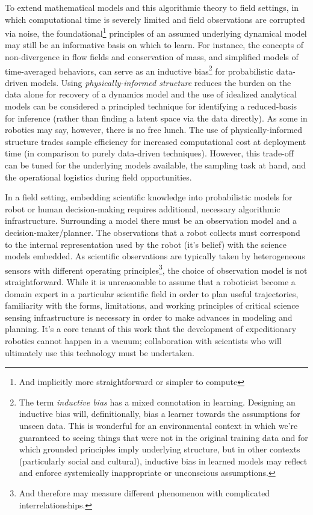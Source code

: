 To extend mathematical models and this algorithmic theory to field settings, in which computational time is severely limited and field observations are corrupted via noise, the foundational\footnote{And implicitly more straightforward or simpler to compute} principles of an assumed underlying dynamical model may still be an informative basis on which to learn.
For instance, the concepts of non-divergence in flow fields and conservation of mass, and simplified models of time-averaged behaviors, can serve as an inductive bias\footnote{The term \emph{inductive bias} has a mixed connotation in learning. Designing an inductive bias will, definitionally, bias a learner towards the assumptions for unseen data. This is wonderful for an environmental context in which we're guaranteed to seeing things that were not in the original training data and for which grounded principles imply underlying structure, but in other contexts (particularly social and cultural), inductive bias in learned models may reflect and enforce systemically inappropriate or unconscious assumptions.} for probabilistic data-driven models.
Using \emph{physically-informed structure} reduces the burden on the data alone for recovery of a dynamics model and the use of idealized analytical models can be considered a principled technique for identifying a reduced-basis for inference (rather than finding a latent space via the data directly).
As some in robotics may say, however, there is no free lunch.
The use of physically-informed structure trades sample efficiency for increased computational cost at deployment time (in comparison to purely data-driven techniques).
However, this trade-off can be tuned for the underlying models available, the sampling task at hand, and the operational logistics during field opportunities.

In a field setting, embedding scientific knowledge into probabilistic models for robot or human decision-making requires additional, necessary algorithmic infrastructure. 
Surrounding a model there must be an observation model and a decision-maker/planner.
The observations that a robot collects must correspond to the internal representation used by the robot (it's belief) with the science models embedded.
As scientific observations are typically taken by heterogeneous sensors with different operating principles\footnote{And therefore may measure different phenomenon with complicated interrelationships.}, the choice of observation model is not straightforward.
While it is unreasonable to assume that a roboticist become a domain expert in a particular scientific field in order to plan useful trajectories, familiarity with the forms, limitations, and working principles of critical science sensing infrastructure is necessary in order to make advances in modeling and planning.
It's a core tenant of this work that the development of expeditionary robotics cannot happen in a vacuum; collaboration with scientists who will ultimately use this technology must be undertaken.

